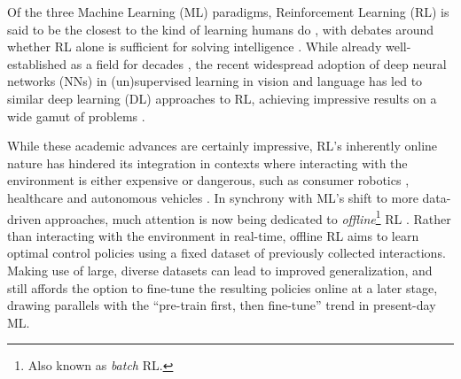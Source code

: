 \documentclass[../thesis-proposal/main.tex]{subfiles}
\begin{document}
Of the three Machine Learning (ML) paradigms, Reinforcement Learning (RL) is said to be the closest
to the kind of learning humans do \citep{sutton_reinforcement_2018}, with debates around whether RL
alone is sufficient for solving intelligence \citep{silver_reward_2021, vamplew_scalar_2022}. While
already well-established as a field for decades \citep{minsky_theory_1954, bellman_dynamic_1957,
klopf_brain_1972, bryson_optimal_1996}, the recent widespread adoption of deep neural networks (NNs)
in (un)supervised learning in vision \citep{krizhevsky_imagenet_2012, he_deep_2016,
mildenhall_nerf_2021} and language \citep{mikolov_distributed_2013, vaswani_attention_2017,
devlin_bert_2019, brown_language_2020} has led to similar deep learning (DL) approaches to RL,
achieving impressive results on a wide gamut of problems \citep{mnih_playing_2013,
silver_general_2018, openai_dota_2019, fawzi_discovering_2022}.

While these academic advances are certainly impressive, RL's inherently online nature has hindered
its integration in contexts where interacting with the environment is either expensive or dangerous,
such as consumer robotics \citep{singh_reinforcement_2022}, healthcare
\citep{liu_reinforcement_2020} and autonomous vehicles \citep{kiran_deep_2022}. In synchrony with
ML's shift to more data-driven approaches, much attention is now being dedicated to
\textit{offline}\footnote{Also known as \textit{batch} RL.} RL \citep{levine_offline_2020,
prudencio_survey_2022}. Rather than interacting with the environment in real-time, offline RL aims
to learn optimal control policies using a fixed dataset of previously collected interactions. Making
use of large, diverse datasets can lead to improved generalization, and still affords the option to
fine-tune the resulting policies online at a later stage, drawing parallels with the ``pre-train
first, then fine-tune'' trend in present-day ML.
\end{document}
